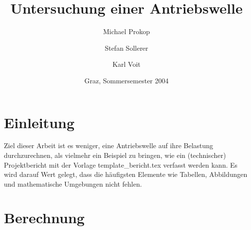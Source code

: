 \documentclass[
a4paper,     %
 headsepline, %
 parskip=half,
 fleqn,       %
12pt         %
]{scrartcl}  %
\title{Untersuchung einer Antriebswelle}
\author{Michael Prokop \and
Stefan Sollerer \and
Karl Voit}
\date{Graz, Sommersemester 2004}
\begin{document}

 \maketitle

 \tableofcontents

 \listoffigures

 \listoftables




\section{Einleitung}
\label{sec:einleitung}

Ziel dieser Arbeit ist es weniger, eine Antriebswelle auf ihre Belastung durchzurechnen, als vielmehr ein Beispiel zu bringen, wie ein (technischer) Projektbericht mit der Vorlage \textsf{template\_bericht.tex} verfasst werden kann. Es wird darauf Wert gelegt, dass die häufigsten Elemente wie Tabellen, Abbildungen und mathematische Umgebungen nicht fehlen.


\section{Berechnung}
\label{sec:berechnung}
\end{document}
